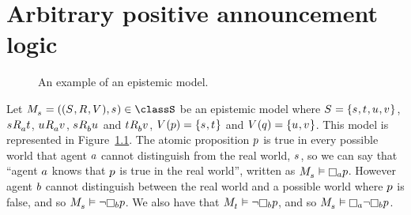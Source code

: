 \chapter{Arbitrary positive announcement logic}\label{papal}

\begin{example}\label{example-el}
\begin{figure}
    \caption{An example of an epistemic model.}\label{example-epistemic-model}
    \centering
\end{figure}

Let $\kPModelAndTuple{\kStateS} \in \classS$ be an epistemic model where $\kStates = \{\kStateS, \kStateT, \kStateU, \kStateV\}$, $\kStateS \kAccessibility{\agentA} \kStateT$, $\kStateU \kAccessibility{\agentA} \kStateV$, $\kStateS \kAccessibility{\agentB} \kStateU$ and $\kStateT \kAccessibility{\agentB} \kStateV$, $\kValuation(\atomP) = \{\kStateS, \kStateT\}$ and $\kValuation(\atomQ) = \{\kStateU, \kStateV\}$.
This model is represented in Figure~\ref{example-epistemic-model}.
The atomic proposition $p$ is true in every possible world that agent $a$ cannot distinguish from the real world, $\kStateS$, so we can say that ``agent $a$ knows that $p$ is true in the real world'', written as $\kPModel{\kStateS} \entails \knowsA \atomP$.
However agent $b$ cannot distinguish between the real world and a possible world where $p$ is false, and so $\kPModel{\kStateS} \entails \neg \knowsB \atomP$. We also have that $\kPModel{\kStateT} \entails \neg \knowsB \atomP$, and so $\kPModel{\kStateS} \entails \knowsA \neg \knowsB \atomP$.
\end{example}

